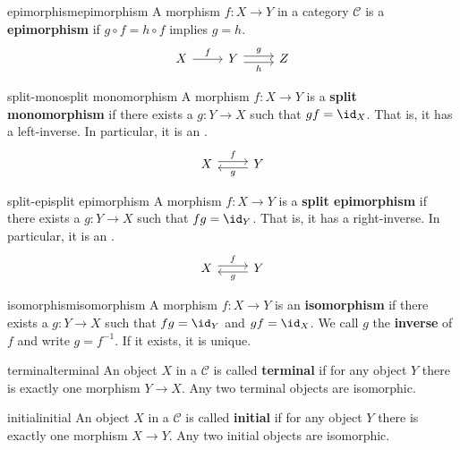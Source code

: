 \begin{topic}{epimorphism}{epimorphism}
    A morphism $f : X \to Y$ in a category $\mathcal{C}$ is a \textbf{epimorphism} if $g \circ f = h \circ f$ implies $g = h$.
    \[ \begin{tikzcd} X \arrow{r}{f} & Y \arrow[shift left=0.25em]{r}{g} \arrow[shift right=0.25em, swap]{r}{h} & Z \end{tikzcd} \]
\end{topic}

\begin{topic}{split-mono}{split monomorphism}
    A morphism $f : X \to Y$ is a \textbf{split monomorphism} if there exists a $g : Y \to X$ such that $gf = \id_X$. That is, it has a left-inverse. In particular, it is an .
    \[ \begin{tikzcd} X \arrow[shift left=0.25em]{r}{f} & Y \arrow[shift left=0.25em]{l}{g} \end{tikzcd} \]
\end{topic}

\begin{topic}{split-epi}{split epimorphism}
    A morphism $f : X \to Y$ is a \textbf{split epimorphism} if there exists a $g : Y \to X$ such that $fg = \id_Y$. That is, it has a right-inverse. In particular, it is an .
    \[ \begin{tikzcd} X \arrow[shift left=0.25em]{r}{f} & Y \arrow[shift left=0.25em]{l}{g} \end{tikzcd} \]
\end{topic}

\begin{topic}{isomorphism}{isomorphism}
    A morphism $f : X \to Y$ is an \textbf{isomorphism} if there exists a $g : Y \to X$ such that $fg = \id_Y$ and $gf = \id_X$. We call $g$ the \textbf{inverse} of $f$ and write $g = f^{-1}$. If it exists, it is unique.
\end{topic}

\begin{topic}{terminal}{terminal}
    An object $X$ in a  $\mathcal{C}$ is called \textbf{terminal} if for any object $Y$ there is exactly one morphism $Y \to X$. Any two terminal objects are isomorphic.
\end{topic}

\begin{topic}{initial}{initial}
    An object $X$ in a  $\mathcal{C}$ is called \textbf{initial} if for any object $Y$ there is exactly one morphism $X \to Y$. Any two initial objects are isomorphic.
\end{topic}

